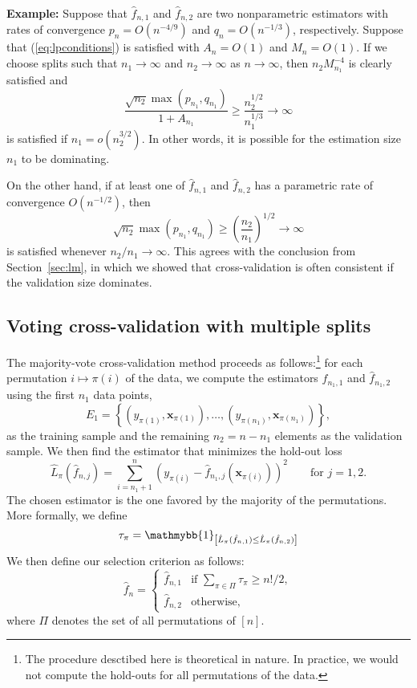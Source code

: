 \documentclass[11pt, letter paper]{article}
\newcommand{\1}{\mathmybb{1}}
\newcommand{\0}{\emptyset}
\newcommand{\paren}[1]{\left(#1 \right)}
\newcommand{\sqbr}[1]{\left[#1 \right]}
\newcommand{\set}[1]{\left\{ #1 \right\}}
\newcommand{\ind}[1]{\mathmybb{1}_{\sqbr{#1}}}
\newcommand{\x}{\boldsymbol{x}}
\newcommand{\fhat}[2]{\hat{f}_{#1, #2}}
\begin{document}
\begin{myproofbox}
    \textbf{Example: } Suppose that \(\fhat{n}{1}\) and \(\fhat{n}{2}\) are two nonparametric estimators with rates of convergence \(p_{n}=O\paren{n^{-4/9}}\) and \(q_{n}=O\paren{n^{-1/3}}\), respectively. Suppose that (\ref{eq:lpconditions}) is satisfied with \(A_{n} = O(1)\) and \(M_{n}=O(1)\). If we choose splits such that \(n_{1}\to\infty\) and \(n_{2}\to\infty\) as \(n\to\infty\), then \(n_{2}M_{n_{1}}^{-4}\) is clearly satisfied and 
    \[\frac{\sqrt{n_{2}}\max(p_{n_{1}}, q_{n_{1}})}{1+A_{n_{1}}} \geq \frac{n_{2}^{1/2}}{n_{1}^{1/3}}\to\infty \]
    is satisfied if \(n_{1}=o\paren{n_{2}^{3/2}}\). In other words, it is possible for the estimation size \(n_{1}\) to be dominating.

    On the other hand, if at least one of \(\fhat{n}{1}\) and \(\fhat{n}{2}\) has a parametric rate of convergence \(O(n^{-1/2})\), then
    \[\sqrt{n_{2}}\max(p_{n_{1}},q_{n_{1}})\geq \paren{\frac{n_{2}}{n_{1}}}^{1/2}\to\infty\]
    is satisfied whenever \(n_{2}/n_{1}\to\infty\). This agrees with the conclusion from Section~\ref{sec:lm}, in which we showed that cross-validation is often consistent if the validation size dominates.
\end{myproofbox}

\subsection{Voting cross-validation with multiple splits}

The majority-vote cross-validation method proceeds as follows:\footnote{The procedure desctibed here is theoretical in nature. In practice, we would not compute the hold-outs for all permutations of the data.} for each permutation \(i\mapsto\pi(i)\) of the data, we compute the estimators \(\fhat{n_{1}}{1}\) and \(\fhat{n_{1}}{2}\) using the first \(n_{1}\) data points,
\[E_{1} = \set{\paren{y_{\pi(1)}, \x_{\pi(1)}}, \ldots,\paren{y_{\pi(n_1)}, \x_{\pi(n_1)}}},\]
as the training sample and the remaining \(n_{2}=n-n_{1}\) elements as the validation sample. We then find the estimator that minimizes the hold-out loss
\[\hat{L}_{\pi}(\fhat{n}{j}) = \sum_{i=n_{1}+1}^{n}\paren{y_{\pi(i)} - \fhat{n_{1}}{j}\paren{\x_{\pi(i)}}}^{2}\qquad \text{for }j=1,2.\]
The chosen estimator is the one favored by the majority of the permutations. More formally, we define 
\[\tau_{\pi} = \ind{\hat{L}_{\pi}(\fhat{n}{1}) \leq \hat{L}_{\pi}(\fhat{n}{2})}\]
We then define our selection criterion as follows:
\[\hat{f}_{n} = \begin{cases}
    \fhat{n}{1} &\text{if }\sum_{\pi\in\Pi}\tau_{\pi} \geq {n!}/{2},\\[2mm]
    \fhat{n}{2} &\text{otherwise,}
\end{cases}\]
where \(\Pi\) denotes the set of all permutations of \([n]\).
\end{document}
